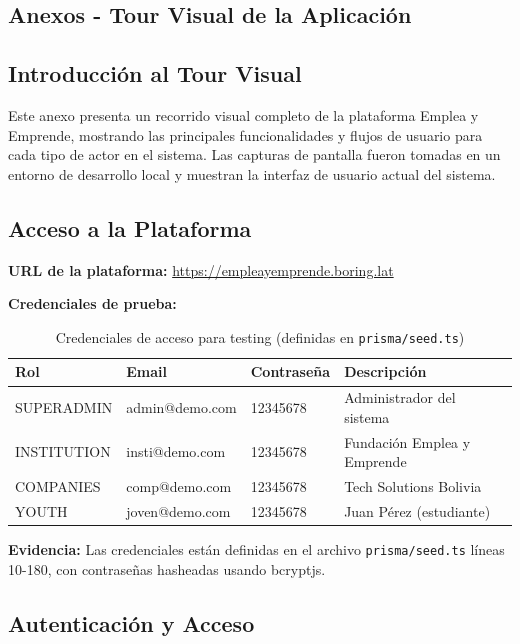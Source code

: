 \documentclass[12pt,a4paper]{article}
\begin{document}
\begin{enumerate}
\section{Anexos - Tour Visual de la Aplicación}

\subsection{Introducción al Tour Visual}

Este anexo presenta un recorrido visual completo de la plataforma Emplea y Emprende, mostrando las principales funcionalidades y flujos de usuario para cada tipo de actor en el sistema. Las capturas de pantalla fueron tomadas en un entorno de desarrollo local y muestran la interfaz de usuario actual del sistema.

\subsection{Acceso a la Plataforma}

\textbf{URL de la plataforma:} \url{https://empleayemprende.boring.lat}

\textbf{Credenciales de prueba:}

\begin{table}[H]
\centering
\begin{tabular}{|l|l|l|l|}
\hline
\textbf{Rol} & \textbf{Email} & \textbf{Contraseña} & \textbf{Descripción} \\
\hline
SUPERADMIN & admin@demo.com & 12345678 & Administrador del sistema \\
\hline
INSTITUTION & insti@demo.com & 12345678 & Fundación Emplea y Emprende \\
\hline
COMPANIES & comp@demo.com & 12345678 & Tech Solutions Bolivia \\
\hline
YOUTH & joven@demo.com & 12345678 & Juan Pérez (estudiante) \\
\hline
\end{tabular}
\caption{Credenciales de acceso para testing (definidas en \texttt{prisma/seed.ts})}
\label{tab:credentials}
\end{table}

\textbf{Evidencia:} Las credenciales están definidas en el archivo \texttt{prisma/seed.ts} líneas 10-180, con contraseñas hasheadas usando bcryptjs.

\subsection{Autenticación y Acceso}


\end{enumerate}
\end{document}
